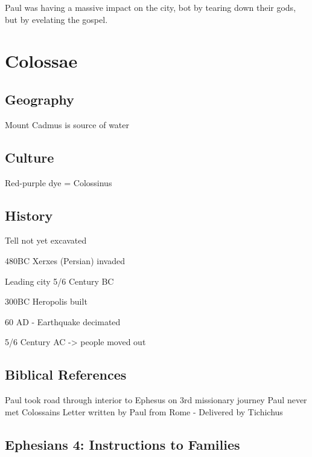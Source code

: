 \documentclass[
]{book}
\begin{document}
Paul was having a massive impact on the city, bot by tearing down their gods, but by evelating the gospel.

\hypertarget{colossae}{%
\chapter{Colossae}\label{colossae}}

\hypertarget{geography-1}{%
\section{Geography}\label{geography-1}}

Mount Cadmus is source of water

\hypertarget{culture-1}{%
\section{Culture}\label{culture-1}}

Red-purple dye = Colossinus

\hypertarget{history-1}{%
\section{History}\label{history-1}}

Tell not yet excavated

480BC Xerxes (Persian) invaded

Leading city 5/6 Century BC

300BC Heropolis built

60 AD - Earthquake decimated

5/6 Century AC -\textgreater{} people moved out

\hypertarget{biblical-references}{%
\section{Biblical References}\label{biblical-references}}

Paul took road through interior to Ephesus on 3rd missionary journey
Paul never met Colossains
Letter written by Paul from Rome - Delivered by Tichichus

\hypertarget{ephesians-4-instructions-to-families}{%
\section{Ephesians 4: Instructions to Families}\label{ephesians-4-instructions-to-families}}
\end{document}
